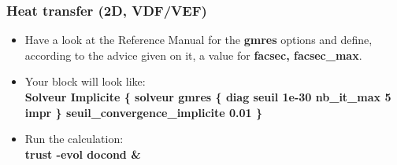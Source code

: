 \documentclass[10pt, hyperref={unicode=true,pdfusetitle, bookmarks=true,bookmarksnumbered=false,bookmarksopen=false, breaklinks=false,pdfborder={0 0 1},backref=true,colorlinks=true,linkcolor=darkblue,pageanchor}]{beamer}
\begin{document}
\begin{frame}
\frametitle{Heat transfer (2D, VDF/VEF)}
\begin{block}{}

\begin{itemize}
\item Have a look at the Reference Manual for the \textbf{gmres} options and define, according to the advice given on it, a value for \textbf{facsec, facsec\_max}.

\item Your block will look like:\\
\textbf{Solveur Implicite \{ solveur gmres \{ diag seuil 1e-30 nb\_it\_max 5 impr \}  seuil\_convergence\_implicite 0.01  \} }

\item Run the calculation:\\
\textbf{trust -evol docond  \&}
\end{itemize}

\end{block}
\end{frame}
\end{document}
